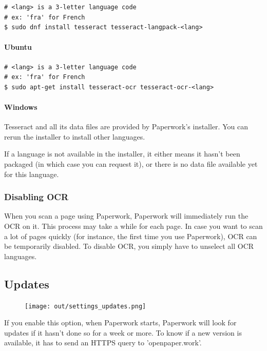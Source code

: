 \documentclass[10pt,a4paper]{article}
\begin{document}
\begin{verbatim}
# <lang> is a 3-letter language code
# ex: 'fra' for French
$ sudo dnf install tesseract tesseract-langpack-<lang>
\end{verbatim}

\paragraph{Ubuntu}

\begin{verbatim}
# <lang> is a 3-letter language code
# ex: 'fra' for French
$ sudo apt-get install tesseract-ocr tesseract-ocr-<lang>
\end{verbatim}

\paragraph{Windows}

Tesseract and all its data files are provided by Paperwork's installer.
You can rerun the installer to install other languages.

If a language is not available in the installer, it either means it
hasn't been packaged (in which case you can request it), or there
is no data file available yet for this language.


\subsubsection{Disabling OCR}

When you scan a page using Paperwork, Paperwork will immediately run
the OCR on it. This process may take a while for each page. In case you want
to scan a lot of pages quickly (for instance, the first time you use
Paperwork), OCR can be temporarily disabled. To disable OCR, you simply have to
unselect all OCR languages.


\subsection{Updates}

\begin{figure}[H]
	\texttt{[image: out/settings\_updates.png]}
\end{figure}

If you enable this option, when Paperwork starts, Paperwork will look for
updates if it hasn't done so for a week or more. To know if a new version is
available, it has to send an HTTPS query to 'openpaper.work'.
\end{document}
